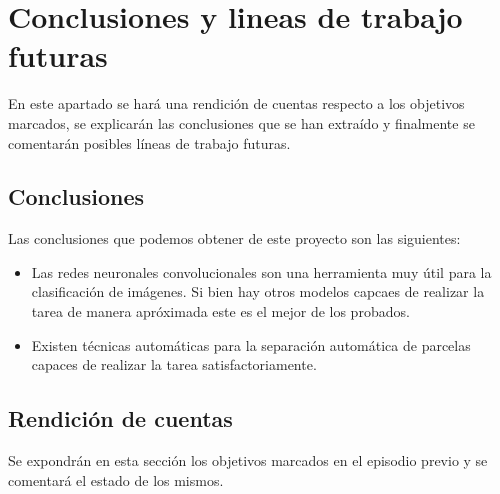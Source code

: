 \chapter{Conclusiones y lineas de trabajo futuras}
En este apartado se hará una rendición de cuentas respecto a los objetivos marcados, se explicarán las conclusiones que se han extraído y finalmente se comentarán posibles líneas de trabajo futuras.

\section{Conclusiones}
Las conclusiones que podemos obtener de este proyecto son las siguientes:

\begin{itemize}
	\item Las redes neuronales convolucionales son una herramienta muy útil para la clasificación de imágenes. Si bien hay otros modelos capcaes de realizar la tarea de manera apróximada este es el mejor de los probados.
	
	\item Existen técnicas automáticas para la separación automática de parcelas capaces de realizar la tarea satisfactoriamente.

\end{itemize}

\section{Rendición de cuentas}
Se expondrán en esta sección los objetivos marcados en el episodio previo y se comentará el estado de los mismos.

